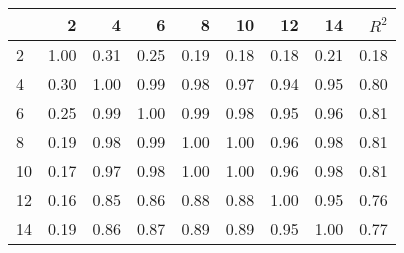 \begin{tabular}{lrrrrrrrr}
\toprule
{} &     2 &     4 &     6 &     8 &    10 &    12 &    14 &  $R^2$ \\
\midrule
2  &  1.00 &  0.31 &  0.25 &  0.19 &  0.18 &  0.18 &  0.21 &   0.18 \\
4  &  0.30 &  1.00 &  0.99 &  0.98 &  0.97 &  0.94 &  0.95 &   0.80 \\
6  &  0.25 &  0.99 &  1.00 &  0.99 &  0.98 &  0.95 &  0.96 &   0.81 \\
8  &  0.19 &  0.98 &  0.99 &  1.00 &  1.00 &  0.96 &  0.98 &   0.81 \\
10 &  0.17 &  0.97 &  0.98 &  1.00 &  1.00 &  0.96 &  0.98 &   0.81 \\
12 &  0.16 &  0.85 &  0.86 &  0.88 &  0.88 &  1.00 &  0.95 &   0.76 \\
14 &  0.19 &  0.86 &  0.87 &  0.89 &  0.89 &  0.95 &  1.00 &   0.77 \\
\bottomrule
\end{tabular}
